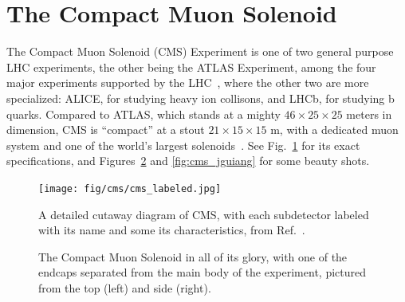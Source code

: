 \section{The Compact Muon Solenoid}\label{sec:cms}
The Compact Muon Solenoid (CMS) Experiment is one of two general purpose LHC experiments, the other being the ATLAS\footnotemark{} Experiment, among the four major experiments supported by the LHC~\cite{LHCWeb}, where the other two are more specialized: ALICE, for studying heavy ion collisons, and LHCb, for studying b quarks. 
Compared to ATLAS, which stands at a mighty $46\times25\times25$ meters in dimension, CMS is ``compact'' at a stout $21\times15\times15$ m, with a dedicated muon system and one of the world's largest solenoids~\cite{ATLASWeb, CMSWeb}. 
See Fig.~\ref{fig:cms_labeled} for its exact specifications, and Figures~\ref{fig:cms_pics} and \ref{fig:cms_jguiang} for some beauty shots. 

\begin{figure}[htb]
    \centering
    \texttt{[image: fig/cms/cms\_labeled.jpg]}
    \caption{
        A detailed cutaway diagram of CMS, with each subdetector labeled with its name and some its characteristics, from Ref.~\cite{Sakuma:2665537}. 
    }
    \label{fig:cms_labeled}
\end{figure}

\begin{figure}[htb]
    \centering
    \quad
    \caption{
        The Compact Muon Solenoid in all of its glory, with one of the endcaps separated from the main body of the experiment, pictured from the top (left) and side (right). 
    }
    \label{fig:cms_pics}
\end{figure}

